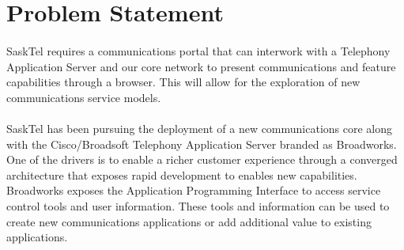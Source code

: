 \documentclass[12pt]{article}
\begin{document}
\pagestyle{plain} %

\tableofcontents %
\cleardoublepage %

\listoffigures %
\cleardoublepage %

\listoftables %
\cleardoublepage %

\pagestyle{plain} %


\doublespacing %

\section{Problem Statement}
\paragraph{} 
	SaskTel requires a communications portal that can interwork with a Telephony Application Server and our core network to present communications and feature capabilities through a browser.  This will allow for the exploration of new communications service models. 
\paragraph{} 
	SaskTel has been pursuing the deployment of a new communications core along with the Cisco/Broadsoft Telephony Application Server branded as Broadworks.  One of the drivers is to enable a richer customer experience through a converged architecture that exposes rapid development to enables new capabilities.  Broadworks exposes the Application Programming Interface to access service control tools and user information.  These tools and information can be used to create new communications applications or add additional value to existing applications.  
\end{document}
